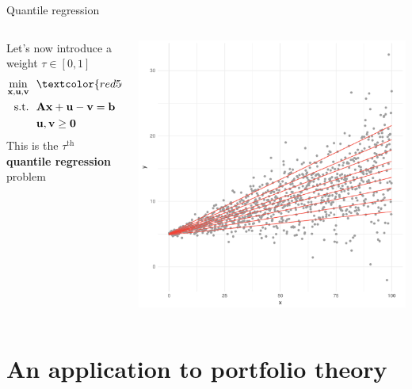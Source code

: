 \documentclass[16pt,aspectratio=169]{beamer}
\renewcommand{\vec}[1]{\ensuremath{\mathbf{#1}}}
\newcommand{\mat}[1]{\ensuremath{\vec{#1}}}
\newcommand{\tr}{\ensuremath{\intercal}}
\begin{document}
\begin{frame}{Quantile regression}
    \begin{columns}
        \begin{column}{0.5\textwidth}
            Let's now introduce a weight \textcolor{red500}{$\tau \in [0, 1]$}
            \begin{align*}
                \min_{\vec{x}, \vec{u}, \vec{v}} \ &\ \textcolor{red500}{\tau}\,\vec{1}_{n}^{\tr} \vec{u} + \textcolor{red500}{(1 - \tau)} \vec{1}_{n}^{\tr} \vec{v} \\
                \text{s.t.}                      \ &\ \mat{A} \vec{x} + \vec{u} - \vec{v} = \vec{b} \\
                                                   &\ \vec{u}, \vec{v} \geq \vec{0}
            \end{align*}
            This is the $\tau^{\text{th}}$ \textbf{quantile regression} problem
        \end{column}
        \begin{column}{0.5\textwidth}
            \includegraphics[height=0.95\textheight]{figures/quantile_regression}
        \end{column}
    \end{columns}
\end{frame}

\section{An application to portfolio theory}
\end{document}

